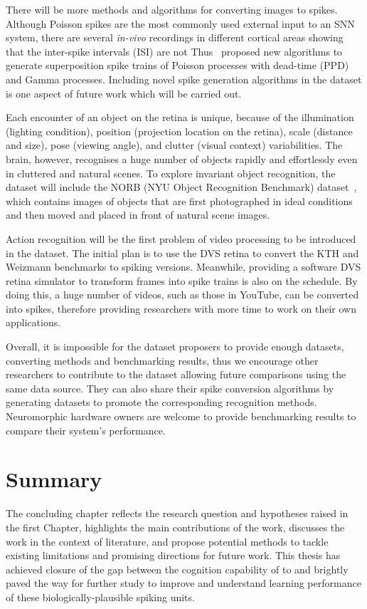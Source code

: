 There will be more methods and algorithms for converting images to spikes.
Although Poisson spikes are the most commonly used external input to an SNN system, there are several \textit{in-vivo} recordings in different cortical areas showing that the inter-spike intervals (ISI) are not \protect{} \protect{}\citet{deger2012statistical}\protect{} 
Thus~\citep{deger2012statistical} proposed new algorithms to generate superposition spike trains of Poisson processes with dead-time (PPD) and \protect{} Gamma processes.
Including novel spike generation algorithms in the dataset is one aspect of future work which will be carried out.

Each encounter of an object on the retina is unique, because of the illumination (lighting condition), position (projection location on the retina), scale (distance and size), pose (viewing angle), and clutter (visual context) variabilities.
The brain, however, recognises a huge number of objects rapidly and effortlessly even in cluttered and natural scenes.
To explore invariant object recognition, the dataset will include the NORB (NYU Object Recognition Benchmark) dataset~\citep{lecun2004learning}, which contains images of objects that are first photographed in ideal conditions and then moved and placed in front of natural scene images.

Action recognition will be the first problem of video processing to be introduced in the dataset.
The initial plan is to use the DVS retina to convert the KTH and Weizmann benchmarks to spiking versions.
Meanwhile, providing a software DVS retina simulator to transform frames into spike trains is also on the schedule.
By doing this, a huge number of videos, such as those in YouTube, can \protect{} be converted \protect{} into spikes, therefore providing researchers with more time to work on their own applications.

Overall, it is impossible for the dataset proposers to provide enough datasets, converting methods and benchmarking results, thus we encourage other researchers to contribute to the dataset allowing future comparisons using the same data source.
They can also share their spike conversion algorithms by generating datasets to promote the corresponding recognition methods.
Neuromorphic hardware owners are welcome to provide benchmarking results to compare their system's performance.
\section{Summary}

The concluding chapter reflects the research question and hypotheses raised in the first Chapter, highlights the main contributions of the work, discusses the work in the context of literature, and propose potential methods to tackle existing limitations and promising directions for future work.
This thesis has achieved closure of the gap between the cognition capability of \protect{} \protect{} to \protect{} \protect{} and brightly paved the way for further study to improve and understand \protect{} learning performance of these biologically-plausible spiking units.